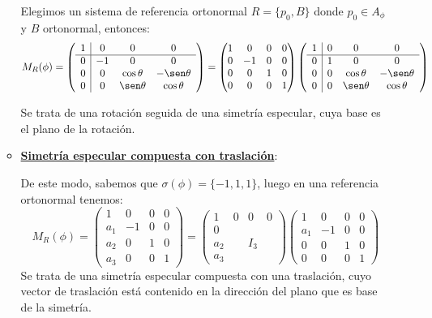 \documentclass[10pt,a4paper,openright]{book}
\begin{document}
\begin{itemize}
\begin{itemize}
Elegimos un sistema de referencia ortonormal $R=\{p_0, B\}$ donde $p_0\in A_\phi$ y $B$ ortonormal, entonces:
$$M_R (\phi) = \left(\begin{array}{c|ccc}
1 & 0  & 0 & 0 \\
\hline
0 & -1 &  0& 0    \\
0 & 0 &  \cos\theta  & -\sen\theta \\
0 & 0 &  \sen\theta & \cos\theta 
\end{array}
\right) = \begin{pmatrix} 1 & 0 & 0 & 0 \\ 0 & -1 & 0 & 0 \\ 0 & 0 & 1 & 0 \\ 0 & 0 & 0 & 1

\end{pmatrix} \left(\begin{array}{c|ccc}
1 & 0  & 0 & 0 \\
\hline
0 & 1 &  0& 0    \\
0 & 0 &  \cos\theta  & -\sen\theta \\
0 & 0 &  \sen\theta & \cos\theta 
\end{array}
\right) $$

Se trata de una rotación seguida de una simetría especular, cuya base es el plano de la rotación.

\item \underline{\textbf{Simetría especular compuesta con traslación}}: 

De este modo, sabemos que $\sigma (\phi)= \{-1 , 1 , 1\}$, luego en una referencia ortonormal tenemos:
$$ M_R (\phi) = \left(\begin{array}{c|ccc}
1 & 0  & 0 & 0 \\
\hline
a_1 & -1 &  0& 0    \\
a_2 & 0 & 1  & 0 \\
a_3 & 0 &  0 & 1
\end{array}
\right) =  \left(\begin{array}{c|ccc}
1 & 0  & 0 & 0 \\
\hline
0 &  &  &     \\
a_2 & & I_3   &  \\
a_3 &  &   &  
\end{array}
\right)  \left( \begin{array}{c|ccc}
1 & 0  & 0 & 0 \\
\hline
a_1 & -1 & 0 & 0   \\
0 &0 & 1   &0  \\
0 & 0 &  0 &  1
\end{array}
\right)$$
Se trata de una simetría especular compuesta con una traslación, cuyo vector de traslación está contenido en la dirección del plano que es base de la simetría.
\end{itemize}
\end{itemize}
\end{document}
